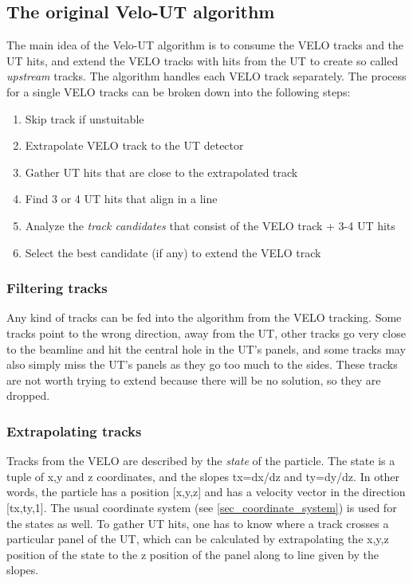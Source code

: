 \documentclass[12pt]{article}
\begin{document}
\subsection{The original Velo-UT algorithm}\label{sec_velout_desc}

The main idea of the Velo-UT algorithm is to consume the VELO tracks and the UT hits, and extend the VELO tracks with hits from the UT to create so called \textit{upstream} tracks. The algorithm handles each VELO track separately. The process for a single VELO tracks can be broken down into the following steps:

\begin{enumerate}
	\item Skip track if unstuitable
	\item Extrapolate VELO track to the UT detector
	\item Gather UT hits that are close to the extrapolated track
	\item Find 3 or 4 UT hits that align in a line
	\item Analyze the \textit{track candidates} that consist of the VELO track + 3-4 UT hits
	\item Select the best candidate (if any) to extend the VELO track
\end{enumerate}

\subsubsection{Filtering tracks}

Any kind of tracks can be fed into the algorithm from the VELO tracking. Some tracks point to the wrong direction, away from the UT, other tracks go very close to the beamline and hit the central hole in the UT's panels, and some tracks may also simply miss the UT's panels as they go too much to the sides. These tracks are not worth trying to extend because there will be no solution, so they are dropped.

\subsubsection{Extrapolating tracks}

Tracks from the VELO are described by the \textit{state} of the particle. The state is a tuple of x,y and z coordinates, and the slopes tx=dx/dz and ty=dy/dz. In other words, the particle has a position [x,y,z] and has a velocity vector in the direction [tx,ty,1]. The usual coordinate system (see \ref{sec_coordinate_system}) is used for the states as well. To gather UT hits, one has to know where a track crosses a particular panel of the UT, which can be calculated by extrapolating the x,y,z position of the state to the z position of the panel along to line given by the slopes.
\end{document}
